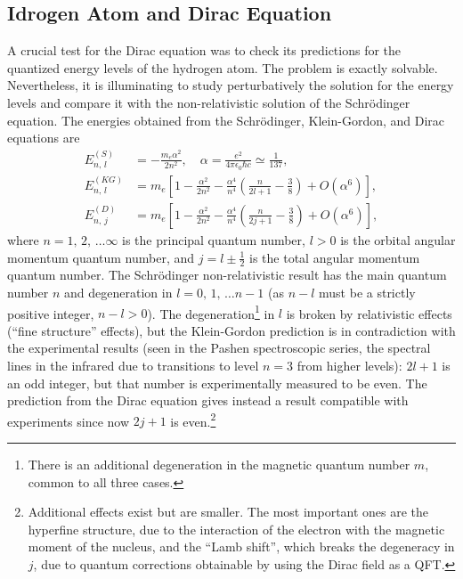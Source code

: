 \subsection{Idrogen Atom and Dirac Equation}

A crucial test for the Dirac equation was to check its predictions for the quantized energy levels of the hydrogen atom. The problem is exactly solvable. Nevertheless, it is illuminating to study perturbatively the solution for the energy levels and compare it with the non-relativistic solution of the Schrödinger equation. The energies obtained from the Schrödinger, Klein-Gordon, and Dirac equations are
\[
    \begin{aligned}
        E^{(S)}_{n,\,l}  & = - \frac{m_e \alpha^2}{2 n^2}, \quad \alpha = \frac{e^2}{4 \pi \epsilon_0 \hbar c} \simeq \frac{1}{137},                       \\
        E^{(KG)}_{n,\,l} & = m_e \left[1 - \frac{\alpha^2}{2n^2} - \frac{\alpha^4}{n^4} \left( \frac{n}{2l + 1} -\frac{3}{8} \right) + O(\alpha^6)\right], \\
        E^{(D)}_{n,\,j}  & = m_e \left[1 - \frac{\alpha^2}{2n^2} - \frac{\alpha^4}{n^4} \left( \frac{n}{2j + 1} -\frac{3}{8} \right) + O(\alpha^6)\right],
    \end{aligned}
\]
where \(n = 1,\,2,\,\dots \infty\) is the principal quantum number, \(l>0\) is the orbital angular momentum quantum number, and \(j = l \pm \tfrac{1}{2}\) is the total angular momentum quantum number. The Schrödinger non-relativistic result has the main quantum number \(n\) and degeneration in \(l = 0,\,1,\,\dots n-1\) (as \(n-l\) must be a strictly positive integer, \(n-l > 0\)). The degeneration\footnote{There is an additional degeneration in the magnetic quantum number \(m\), common to all three cases.} in \(l\) is broken by relativistic effects (“fine structure” effects), but the Klein-Gordon prediction is in contradiction with the experimental results (seen in the Pashen spectroscopic series, the spectral lines in the infrared due to transitions to level \(n=3\) from higher levels): \(2l + 1\) is an odd integer, but that number is experimentally measured to be even. The prediction from the Dirac equation gives instead a result compatible with experiments since now \(2j + 1\) is even.\footnote{Additional effects exist but are smaller. The most important ones are the hyperfine structure, due to the interaction of the electron with the magnetic moment of the nucleus, and the “Lamb shift”, which breaks the degeneracy in \(j\), due to quantum corrections obtainable by using the Dirac field as a QFT.}

